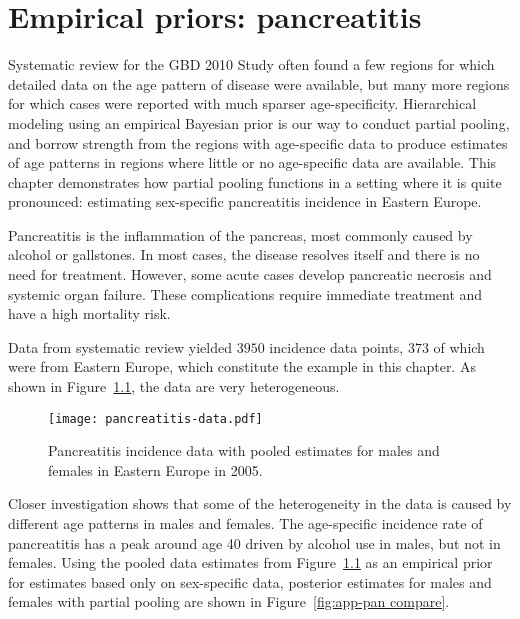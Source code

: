 \chapter{Empirical priors: pancreatitis}
\label{applications-priors_empirical}

Systematic review for the GBD 2010 Study often found a few regions for
which detailed data on the age pattern of disease were available, but
many more regions for which cases were reported with much sparser
age-specificity.  Hierarchical modeling using an empirical Bayesian
prior is our way to conduct partial pooling, and borrow strength from
the regions with age-specific data to produce estimates of age
patterns in regions where little or no age-specific data are available.
This chapter demonstrates how partial pooling functions in a
setting where it is quite pronounced: estimating sex-specific
pancreatitis incidence in Eastern Europe.

Pancreatitis is the inflammation of the pancreas, most commonly
caused by alcohol or gallstones.  In most cases, the disease resolves
itself and there is no need for treatment.  However, some acute
cases develop pancreatic necrosis and systemic organ failure.  These
complications require immediate treatment and have a high mortality risk.
\cite{raraty_acute_2004, banks_epidemiology_2002, sekimoto_JPN_2006}

Data from systematic review yielded $3950$ incidence data points,
$373$ of which were from Eastern Europe, which constitute the example
in this chapter.  As shown in Figure~\ref{fig:app-pan data}, the data
are very heterogeneous.

    \begin{figure}[h]
        \begin{center}
            \texttt{[image: pancreatitis-data.pdf]}
            \caption{Pancreatitis incidence data
              with pooled estimates for males and females in Eastern Europe in 2005.}
            \label{fig:app-pan data}
        \end{center}
    \end{figure}

Closer investigation shows that some of the heterogeneity in the data
is caused by different age patterns in males and females.  The
age-specific incidence rate of pancreatitis has a peak around age 40
driven by alcohol use in males, but not in females.  Using the pooled data estimates from
Figure~\ref{fig:app-pan data} as an empirical prior for estimates
based only on sex-specific data, posterior estimates for males and
females with partial pooling are shown in Figure~\ref{fig:app-pan
  compare}.

